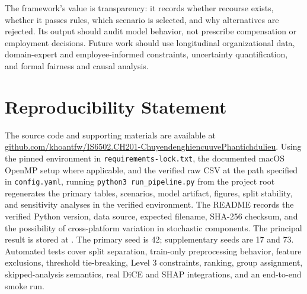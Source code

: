 \documentclass[11pt]{article}
\begin{document}
The framework's value is transparency: it records whether recourse exists, whether it passes rules, which scenario is selected, and why alternatives are rejected. Its output should audit model behavior, not prescribe compensation or employment decisions. Future work should use longitudinal organizational data, domain-expert and employee-informed constraints, uncertainty quantification, and formal fairness and causal analysis.

\section*{Reproducibility Statement}
The source code and supporting materials are available at \href{https://github.com/khoantfw/IS6502.CH201-ChuyendenghiencuuvePhantichdulieu}{github.com/khoantfw/IS6502.CH201-ChuyendenghiencuuvePhantichdulieu}. Using the pinned environment in \texttt{requirements-lock.txt}, the documented macOS OpenMP setup where applicable, and the verified raw CSV at the path specified in \texttt{config.yaml}, running \texttt{python3 run\_pipeline.py} from the project root regenerates the primary tables, scenarios, model artifact, figures, split stability, and sensitivity analyses in the verified environment. The README records the verified Python version, data source, expected filename, SHA-256 checksum, and the possibility of cross-platform variation in stochastic components. The principal result is stored at . The primary seed is 42; supplementary seeds are 17 and 73. Automated tests cover split separation, train-only preprocessing behavior, feature exclusions, threshold tie-breaking, Level 3 constraints, ranking, group assignment, skipped-analysis semantics, real DiCE and SHAP integrations, and an end-to-end smoke run.
\end{document}
